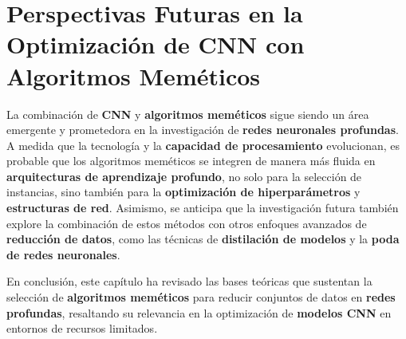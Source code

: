\section{Perspectivas Futuras en la Optimización de CNN con Algoritmos Meméticos}
\label{sec:perspectivas-futuras-en-la-optimizacion-de-cnn-con-algoritmos-memeticos}
La combinación de \textbf{CNN} y \textbf{algoritmos meméticos} sigue siendo un área emergente y prometedora en la
investigación de \textbf{redes neuronales profundas}.
A medida que la tecnología y la \textbf{capacidad de procesamiento} evolucionan, es probable que los algoritmos
meméticos se integren de manera más fluida en \textbf{arquitecturas de aprendizaje profundo}, no solo para la selección
de instancias, sino también para la \textbf{optimización de hiperparámetros} y \textbf{estructuras de red}.
Asimismo, se anticipa que la investigación futura también explore la combinación de estos métodos con otros enfoques
avanzados de \textbf{reducción de datos}, como las técnicas de \textbf{distilación de modelos} y la
\textbf{poda de redes neuronales}.


En conclusión, este capítulo ha revisado las bases teóricas que sustentan la selección de
\textbf{algoritmos meméticos} para reducir conjuntos de datos en \textbf{redes profundas}, resaltando su relevancia en
la optimización de \textbf{modelos CNN} en entornos de recursos limitados.
